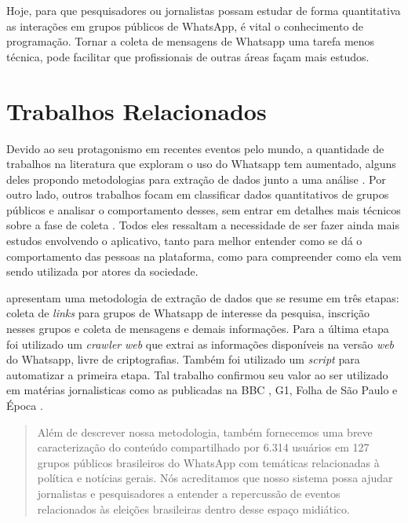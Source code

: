 Hoje, para que pesquisadores ou jornalistas possam estudar de forma quantitativa as interações em grupos públicos de WhatsApp, é vital o conhecimento de programação. Tornar a coleta de mensagens de Whatsapp uma tarefa menos técnica, pode facilitar que profissionais de outras áreas façam mais estudos. 


\section{Trabalhos Relacionados}
\label{cap:trabalhosrelacionados}

Devido ao seu protagonismo em recentes eventos pelo mundo, a quantidade de trabalhos na literatura que exploram o uso do Whatsapp tem aumentado, alguns deles propondo metodologias para extração de dados junto a uma análise \cite{resende2018system, garimella2018whatapp}. Por outro lado, outros trabalhos focam em classificar dados quantitativos de grupos públicos e analisar o comportamento desses, sem entrar em detalhes mais técnicos sobre a fase de coleta \cite{machado2019study, caetano2018analyzing}. Todos eles ressaltam a necessidade de ser fazer ainda mais estudos envolvendo o aplicativo, tanto para melhor entender como se dá o comportamento das pessoas na plataforma, como para compreender como ela vem sendo utilizada por atores da sociedade.

 apresentam uma metodologia de extração de dados que se resume em três etapas: coleta de \textit{links} para grupos de Whatsapp de interesse da pesquisa, inscrição nesses grupos e coleta de mensagens e demais informações. Para a última etapa foi utilizado um \textit{crawler} \textit{web} que extrai as informações disponíveis na versão \textit{web} do Whatsapp, livre de criptografias. Também foi utilizado um \textit{script} para automatizar a primeira etapa. Tal trabalho confirmou seu valor ao ser utilizado em matérias jornalisticas como as publicadas na BBC \cite{amanda2018bbc}, G1, Folha de São Paulo e Época \cite{tardaguila2019epoca}.

\begin{quote}
    Além de descrever nossa metodologia, também fornecemos uma breve caracterização do conteúdo compartilhado por 6.314 usuários em 127 grupos públicos brasileiros do WhatsApp com temáticas relacionadas à política e notícias gerais. Nós acreditamos que nosso sistema possa ajudar jornalistas e pesquisadores a entender a repercussão de eventos relacionados às eleições brasileiras dentro desse espaço midiático.
    \cite[p.~387]{resende2018system}
\end{quote}


